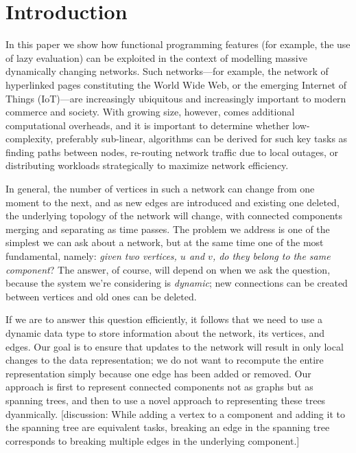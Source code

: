 \section{Introduction}
\label{sec:Intro}

In this paper we show how functional programming features (for example, the use of lazy evaluation) can be exploited in the context of modelling massive dynamically changing networks. Such networks---for example, the network of hyperlinked pages constituting the World Wide Web, or the emerging Internet of Things (IoT)---are increasingly ubiquitous and increasingly important to modern commerce and society. With growing size, however, comes additional computational overheads, and it is important to determine whether low-complexity, preferably sub-linear, algorithms can be derived for such key tasks as finding paths between nodes, re-routing network traffic due to local outages, or distributing workloads strategically to maximize network efficiency.



In general, the number of vertices in such a network can change from one moment to the next, and as new edges are introduced and existing one deleted, the underlying topology of the network will change, with connected components merging and separating as time passes. The problem we address is one of the simplest we can ask about a network, but at the same time one of the most fundamental, namely: \emph{given two vertices, $u$ and $v$, do they belong to the same component}? The answer, of course, will depend on when we ask the question, because the system we're considering is \emph{dynamic}; new connections can be created between vertices and old ones can be deleted.

If we are to answer this question efficiently, it follows that we need to use a dynamic data type to store information about the network, its vertices, and edges. Our goal is to ensure that updates to the network will result in only local changes to the data representation; we do not want to recompute the entire representation simply because one edge has been added or removed. Our approach is first to represent connected components not as graphs but as spanning trees, and then to use a novel approach to representing these trees dyanmically. [discussion: While adding a vertex to a component and adding it to the spanning tree are equivalent tasks, breaking an edge in the spanning tree corresponds to breaking multiple edges in the underlying component.]



